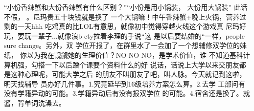 “小份香辣蟹和大份香辣蟹有什么区别？”“小份是用小锅装，
大份用大锅装” 此话不假，🙂。尼玛贵五十块钱就是换了
一个大锅嘛！中午香辣蟹+晚上火锅，营养过剩的一天hhh
吃鸡真的比LOL有意思，就像初中觉得穿越火线这个游戏真
尼玛好玩，要玩一辈子...就像浪b cty拉着李理的手说“这
是以后要结婚的“一样，people sure change。另外，双
学位开报了，在群里水了一会加了一个想辅修双学位的妹纸，
你以为我在觊觎她的生理价值？NO NO NO，是学术价值，谁
不知道基科计算机强，勾搭一下以后蹭个课要个资料什么的好
说话，话说上大学以来交朋友都是这种心理呢，可能大学之后
的朋友不叫朋友了吧，叫人脉。今天就记到这啦，明天找辅导
员办好几件事。1.究竟延毕到16级培养方案怎么算。2.去学
工部问有没有学籍异动的可能。3.学籍异动后有没有报双学位
的可能。4.宿舍还是换了。就酱，背单词洗澡去。
